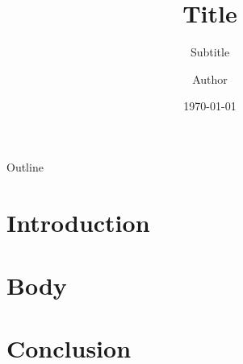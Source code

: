 \documentclass[compress,aspectratio=43]{beamer}
\title{Title}
\subtitle{Subtitle}
\author{Author}
\date{\today}
\institute[XXXX]{University of XXXX}
\begin{document}
\begin{frame}[plain]
    \titlepage
\end{frame}

\begin{frame}{Outline}
    \tableofcontents[sectionstyle=show,subsectionstyle=show/shaded/hide,
        subsubsectionstyle=show/shaded/hide]
\end{frame}

\section{Introduction}

\begin{frame}

\end{frame}

\section{Body}

\begin{frame}

\end{frame}

\section{Conclusion}

\begin{frame}

\end{frame}
\end{document}
